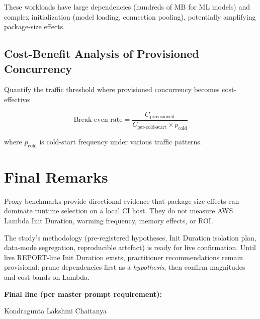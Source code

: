 These workloads have large dependencies (hundreds of MB for ML models) and complex initialization (model loading, connection pooling), potentially amplifying package-size effects.

\subsection{Cost-Benefit Analysis of Provisioned Concurrency}

Quantify the traffic threshold where provisioned concurrency becomes cost-effective:

\begin{equation}
\text{Break-even rate} = \frac{C_{\text{provisioned}}}{C_{\text{per-cold-start}} \times p_{\text{cold}}}
\end{equation}

where $p_{\text{cold}}$ is cold-start frequency under various traffic patterns.

\section{Final Remarks}

Proxy benchmarks provide directional evidence that package-size effects can dominate runtime selection on a local CI host. They do not measure AWS Lambda Init Duration, warming frequency, memory effects, or ROI.

The study's methodology (pre-registered hypotheses, Init Duration isolation plan, data-mode segregation, reproducible artefact) is ready for live confirmation. Until live REPORT-line Init Duration exists, practitioner recommendations remain provisional: prune dependencies first as a \textit{hypothesis}, then confirm magnitudes and cost bands on Lambda.

\textbf{Final line (per master prompt requirement):}

Kondragunta Lakshmi Chaitanya

